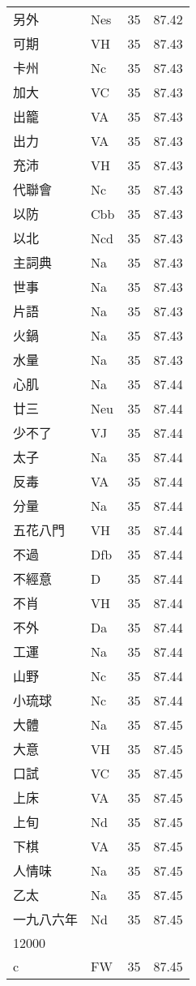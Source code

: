 \documentclass[twocolumn]{book}
\begin{document}
\begin{supertabular}{llrr}
另外 & Nes & 35 &  87.42\\
可期 & VH & 35 &  87.43\\
卡州 & Nc & 35 &  87.43\\
加大 & VC & 35 &  87.43\\
出籠 & VA & 35 &  87.43\\
出力 & VA & 35 &  87.43\\
充沛 & VH & 35 &  87.43\\
代聯會 & Nc & 35 &  87.43\\
以防 & Cbb & 35 &  87.43\\
以北 & Ncd & 35 &  87.43\\
主詞典 & Na & 35 &  87.43\\
世事 & Na & 35 &  87.43\\
片語 & Na & 35 &  87.43\\
火鍋 & Na & 35 &  87.43\\
水量 & Na & 35 &  87.43\\
心肌 & Na & 35 &  87.44\\
廿三 & Neu & 35 &  87.44\\
少不了 & VJ & 35 &  87.44\\
太子 & Na & 35 &  87.44\\
反毒 & VA & 35 &  87.44\\
分量 & Na & 35 &  87.44\\
五花八門 & VH & 35 &  87.44\\
不過 & Dfb & 35 &  87.44\\
不經意 & D & 35 &  87.44\\
不肖 & VH & 35 &  87.44\\
不外 & Da & 35 &  87.44\\
工運 & Na & 35 &  87.44\\
山野 & Nc & 35 &  87.44\\
小琉球 & Nc & 35 &  87.44\\
大體 & Na & 35 &  87.45\\
大意 & VH & 35 &  87.45\\
口試 & VC & 35 &  87.45\\
上床 & VA & 35 &  87.45\\
上旬 & Nd & 35 &  87.45\\
下棋 & VA & 35 &  87.45\\
人情味 & Na & 35 &  87.45\\
乙太 & Na & 35 &  87.45\\
一九八六年 & Nd & 35 &  87.45\\
12000\\
c & FW & 35 &  87.45\\

\end{supertabular}
\end{document}
